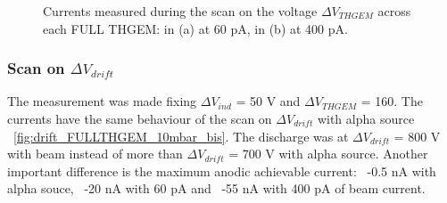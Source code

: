 \documentclass[a4paper, 11 pt]{article}
\newcommand{\Vind}{$\Delta V_{ind}$}
\newcommand{\Vthgem}{$\Delta V_{THGEM}$}
\newcommand{\Vdrift}{$ \Delta V_{drift}$}
\begin{document}
\begin{figure}[!htb]
	\centering
	\caption{Currents measured during the scan on the voltage \Vthgem{} across each FULL THGEM: in (a) at 60 pA, in (b) at 400 pA.}
	\label{fig:thgemScan_THGEM10_beam_10mbar}
\end{figure}

\subsubsection{Scan on \Vdrift}

The measurement was made fixing \Vind{} = 50 V and \Vthgem{} = 160. The currents have the same behaviour of the scan on \Vdrift{} with alpha source ~\ref{fig:drift_FULLTHGEM_10mbar_bis}. The discharge was at \Vdrift{} = 800 V with beam instead of more than \Vdrift{} = 700 V with alpha source. Another important difference is the maximum anodic achievable current: ~-0.5 nA with alpha souce, ~-20 nA with 60 pA and ~-55 nA with 400 pA of beam current.
\end{document}
